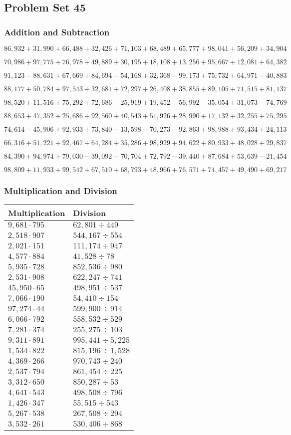 \hypertarget{problem-set-45-3}{%
\subsection{Problem Set 45}\label{problem-set-45-3}}

\hypertarget{addition-and-subtraction-267}{%
\subsubsection{Addition and
Subtraction}\label{addition-and-subtraction-267}}

\(86,932+31,990+66,488+32,426+71,103+68,489+65,777+98,041+56,209+ 34,904\)

\(70,986+97,775+76,978+49,889+30,195+18,108+13,256+95,667+12,081+64,382\)

\(91,123-88,631+67,669+84,694-54,168+32,368-99,173+75,732+64,971-40,883\)

\(88,177+50,784+97,543+32,681+72,297+26,408+38,855+89,105+71,515+81,137\)

\(98,520+11,516+75,292+72,686-25,919+19,452-56,992-35,054+31,073-74,769\)

\(88,653+47,352+25,686+92,560+40,543+51,926+28,990+17,132+32,255+75,295\)

\(74,614-45,906+92,933+73,840-13,598-70,273-92,863+98,988+93,434+24,113\)

\(66,316+51,221+92,467+64,284+35,286+98,929+94,622+80,933+48,028+29,837\)

\(84,390+94,974+79,030-39,092-70,704+72,792-39,440+87,684+53,639-21,454\)

\(98,809+11,933+99,542+67,510+68,793+48,966+76,571+74,457+49,490+69,217\)

\hypertarget{multiplication-and-division-266}{%
\subsubsection{Multiplication and
Division}\label{multiplication-and-division-266}}

\begin{longtable}[]{@{}ll@{}}
\toprule
Multiplication & Division\tabularnewline
\midrule
\endhead
\(9,681\cdot795\) & \(62,801÷449\)\tabularnewline
\(2,518\cdot907\) & \(544,167÷554\)\tabularnewline
\(2,021\cdot151\) & \(111,174÷947\)\tabularnewline
\(4,577\cdot884\) & \(41,528÷78\)\tabularnewline
\(5,935\cdot728\) & \(852,536÷980\)\tabularnewline
\(2,531\cdot908\) & \(622,247÷741\)\tabularnewline
\(45,950\cdot65\) & \(498,951÷537\)\tabularnewline
\(7,066\cdot190\) & \(54,410÷154\)\tabularnewline
\(97,274\cdot44\) & \(599,900÷914\)\tabularnewline
\(6,066\cdot792\) & \(558,532÷529\)\tabularnewline
\(7,281\cdot374\) & \(255,275÷103\)\tabularnewline
\(9,311\cdot891\) & \(995,441÷5,225\)\tabularnewline
\(1,534\cdot822\) & \(815,196÷1,528\)\tabularnewline
\(4,369\cdot266\) & \(970,743÷240\)\tabularnewline
\(2,537\cdot794\) & \(861,454÷225\)\tabularnewline
\(3,312\cdot650\) & \(850,287÷53\)\tabularnewline
\(4,641\cdot543\) & \(498,508÷796\)\tabularnewline
\(1,426\cdot347\) & \(55,515÷543\)\tabularnewline
\(5,267\cdot538\) & \(267,508÷294\)\tabularnewline
\(3,532\cdot261\) & \(530,406÷868\)\tabularnewline
\bottomrule
\end{longtable}

